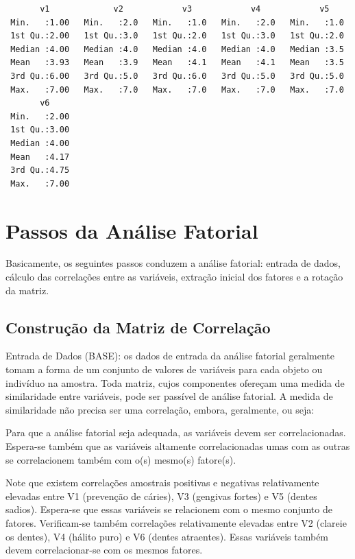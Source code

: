 \documentclass[12pt,brazil,oneside]{book}
\begin{document}
\begin{verbatim}
       v1             v2            v3            v4            v5     
 Min.   :1.00   Min.   :2.0   Min.   :1.0   Min.   :2.0   Min.   :1.0  
 1st Qu.:2.00   1st Qu.:3.0   1st Qu.:2.0   1st Qu.:3.0   1st Qu.:2.0  
 Median :4.00   Median :4.0   Median :4.0   Median :4.0   Median :3.5  
 Mean   :3.93   Mean   :3.9   Mean   :4.1   Mean   :4.1   Mean   :3.5  
 3rd Qu.:6.00   3rd Qu.:5.0   3rd Qu.:6.0   3rd Qu.:5.0   3rd Qu.:5.0  
 Max.   :7.00   Max.   :7.0   Max.   :7.0   Max.   :7.0   Max.   :7.0  
       v6      
 Min.   :2.00  
 1st Qu.:3.00  
 Median :4.00  
 Mean   :4.17  
 3rd Qu.:4.75  
 Max.   :7.00  
\end{verbatim}

\hypertarget{passos-da-analise-fatorial}{%
\section{Passos da Análise Fatorial}\label{passos-da-analise-fatorial}}

Basicamente, os seguintes passos conduzem a análise fatorial: entrada de
dados, cálculo das correlações entre as variáveis, extração inicial dos
fatores e a rotação da matriz.

\hypertarget{construcao-da-matriz-de-correlacao}{%
\subsection{Construção da Matriz de
Correlação}\label{construcao-da-matriz-de-correlacao}}

Entrada de Dados (BASE): os dados de entrada da análise fatorial
geralmente tomam a forma de um conjunto de valores de variáveis para
cada objeto ou indivíduo na amostra. Toda matriz, cujos componentes
ofereçam uma medida de similaridade entre variáveis, pode ser passível
de análise fatorial. A medida de similaridade não precisa ser uma
correlação, embora, geralmente, ou seja:

Para que a análise fatorial seja adequada, as variáveis devem ser
correlacionadas. Espera-se também que as variáveis altamente
correlacionadas umas com as outras se correlacionem também com o(s)
mesmo(s) fatore(s).

Note que existem correlações amostrais positivas e negativas
relativamente elevadas entre V1 (prevenção de cáries), V3 (gengivas
fortes) e V5 (dentes sadios). Espera-se que essas variáveis se
relacionem com o mesmo conjunto de fatores. Verificam-se também
correlações relativamente elevadas entre V2 (clareie os dentes), V4
(hálito puro) e V6 (dentes atraentes). Essas variáveis também devem
correlacionar-se com os mesmos fatores.
\end{document}
